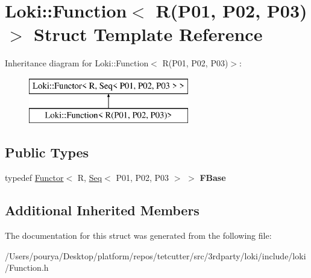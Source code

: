 \hypertarget{structLoki_1_1Function_3_01R_07P01_00_01P02_00_01P03_08_4}{}\section{Loki\+:\+:Function$<$ R(P01, P02, P03)$>$ Struct Template Reference}
\label{structLoki_1_1Function_3_01R_07P01_00_01P02_00_01P03_08_4}
Inheritance diagram for Loki\+:\+:Function$<$ R(P01, P02, P03)$>$\+:\begin{figure}[H]
\begin{center}
\leavevmode
\includegraphics[height=2.000000cm]{structLoki_1_1Function_3_01R_07P01_00_01P02_00_01P03_08_4}
\end{center}
\end{figure}
\subsection*{Public Types}
\begin{DoxyCompactItemize}
\item 
\hypertarget{structLoki_1_1Function_3_01R_07P01_00_01P02_00_01P03_08_4_af973d97cea9d6314483e2099e9844320}{}typedef \hyperlink{classLoki_1_1Functor}{Functor}$<$ R, \hyperlink{structLoki_1_1Seq}{Seq}$<$ P01, P02, P03 $>$ $>$ {\bfseries F\+Base}\label{structLoki_1_1Function_3_01R_07P01_00_01P02_00_01P03_08_4_af973d97cea9d6314483e2099e9844320}

\end{DoxyCompactItemize}
\subsection*{Additional Inherited Members}


The documentation for this struct was generated from the following file\+:\begin{DoxyCompactItemize}
\item 
/\+Users/pourya/\+Desktop/platform/repos/tetcutter/src/3rdparty/loki/include/loki/Function.\+h\end{DoxyCompactItemize}
